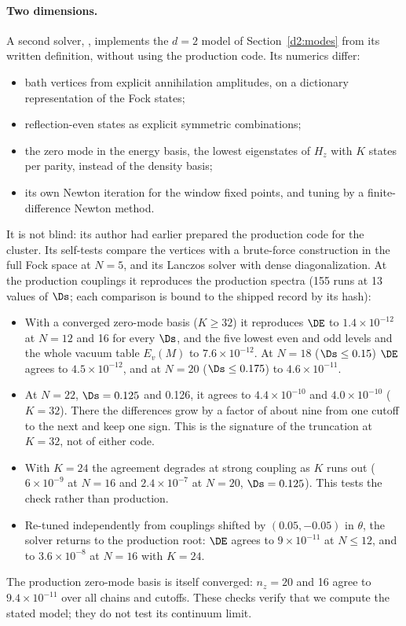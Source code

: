\paragraph{Two dimensions.}\label{d2:checks}
A second solver, , implements the $d=2$ model of Section~\ref{d2:modes} from its written
definition, without using the production code. Its numerics differ:
\begin{itemize}
\item bath vertices from explicit annihilation amplitudes, on a dictionary representation of the Fock states;
\item reflection-even states as explicit symmetric combinations;
\item the zero mode in the energy basis, the lowest eigenstates of $H_z$ with $K$ states per parity, instead of the
 density basis;
\item its own Newton iteration for the window fixed points, and tuning by a finite-difference Newton method.
\end{itemize}
It is not blind: its author had earlier prepared the production code for the cluster. Its self-tests compare the
vertices with a brute-force construction in the full Fock space at $N=5$, and its Lanczos solver with dense
diagonalization. At the production couplings it reproduces the production spectra (155 runs at 13 values of $\Ds$; each
comparison is bound to the shipped record by its hash):
\begin{itemize}
\item With a converged zero-mode basis ($K\ge32$) it reproduces $\DE$ to $1.4\times10^{-12}$ at $N=12$ and 16 for every
 $\Ds$, and the five lowest even and odd levels and the whole vacuum table $E_v(M)$ to $7.6\times10^{-12}$. At $N=18$
 ($\Ds\le0.15$) $\DE$ agrees to $4.5\times10^{-12}$, and at $N=20$ ($\Ds\le0.175$) to $4.6\times10^{-11}$.
\item At $N=22$, $\Ds=0.125$ and 0.126, it agrees to $4.4\times10^{-10}$ and $4.0\times10^{-10}$ ($K=32$). There the
 differences grow by a factor of about nine from one cutoff to the next and keep one sign. This is the signature of the
 truncation at $K=32$, not of either code.
\item With $K=24$ the agreement degrades at strong coupling as $K$ runs out ($6\times10^{-9}$ at $N=16$ and
 $2.4\times10^{-7}$ at $N=20$, $\Ds=0.125$). This tests the check rather than production.
\item Re-tuned independently from couplings shifted by $(0.05,-0.05)$ in $\theta$, the solver returns to the production
 root: $\DE$ agrees to $9\times10^{-11}$ at $N\le12$, and to $3.6\times10^{-8}$ at $N=16$ with $K=24$.
\end{itemize}
The production zero-mode basis is itself converged: $n_z=20$ and 16 agree to $9.4\times10^{-11}$ over all chains and
cutoffs. These checks verify that we compute the stated model; they do not test its continuum limit.
